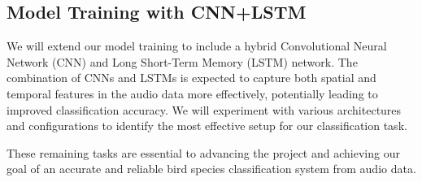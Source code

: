 \subsection{Model Training with CNN+LSTM}
We will extend our model training to include a hybrid Convolutional Neural Network (CNN) and Long Short-Term Memory (LSTM) network. The combination of CNNs and LSTMs is expected to capture both spatial and temporal features in the audio data more effectively, potentially leading to improved classification accuracy. We will experiment with various architectures and configurations to identify the most effective setup for our classification task.

These remaining tasks are essential to advancing the project and achieving our goal of an accurate and reliable bird species classification system from audio data.

\newpage

\renewcommand\bibname{REFERENCES} %





